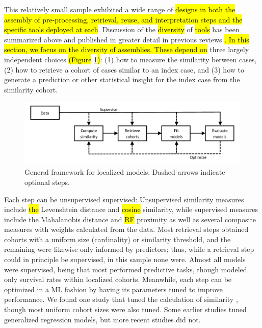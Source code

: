 \documentclass[sn-mathphys,Numbered,pdflatex]{sn-jnl}
\theoremstyle{remark}
\theoremstyle{definition}
\begin{document}
This relatively small sample exhibited a wide range of
\hl{designs in both the assembly of pre-processing, retrieval, reuse, and interpretation steps and the specific tools deployed at each}.
Discussion of the \hl{diversity} of \hl{tools} has been summarized above
and published in greater detail in previous reviews
\citep{Choudhury2016, Sharafoddini2017, Parimbelli2018}\hl{. In this section, we focus on the diversity of assemblies. These depend on}
three largely independent choices
\hl{(Figure }\ref{fig:framework}\hl{)}: (1) how to measure the
similarity between cases, (2) how to retrieve a cohort of cases similar
to an index case, and (3) how to generate a prediction or other
statistical insight for the index case from the similarity cohort.

\begin{figure}

{\centering \includegraphics[width=1\linewidth]{Fig5} 

}

\caption{General framework for localized models.
 Dashed arrows indicate optional steps.}\label{fig:framework}
\end{figure}

Each step can be unsupervised supervised: Unsupervised similarity
measures include \hl{the} Levenshtein distance and \hl{cosine}
similarity, while supervised measures include the Mahalanobis distance
and \hl{RF} proximity as well as several composite measures with weights
calculated from the data. Most retrieval steps obtained cohorts with a
uniform size (cardinality) or similarity threshold, and the remaining
were likewise only informed by predictors; thus, while a retrieval step
could in principle be supervised, in this sample none were. Almost all
models were supervised, being that most performed predictive tasks,
though \citet{Mariuzzi1997} modeled only survival rates within localized
cohorts. Meanwhile, each step can be optimized in a ML fashion by having
its parameters tuned to improve performance. We found one study that
tuned the calculation of similarity \citep{Liu2022}, though most uniform
cohort sizes were also tuned. Some earlier studies tuned generalized
regression models, but more recent studies did not.
\end{document}
